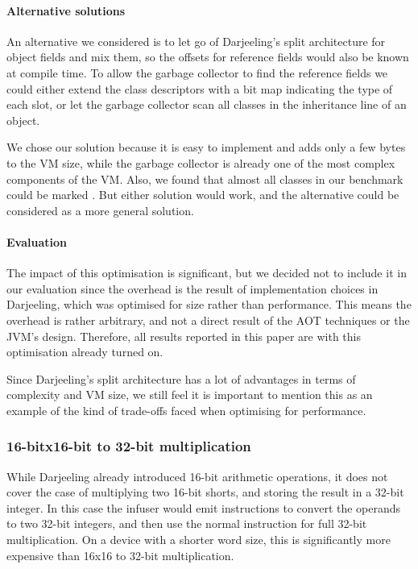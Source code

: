\paragraph{Alternative solutions} An alternative we considered is to let go of Darjeeling's split architecture for object fields and mix them, so the offsets for reference fields would also be known at compile time. To allow the garbage collector to find the reference fields we could either extend the class descriptors with a bit map indicating the type of each slot, or let the garbage collector scan all classes in the inheritance line of an object.

We chose our solution because it is easy to implement and adds only a few bytes to the VM size, while the garbage collector is already one of the most complex components of the VM. Also, we found that almost all classes in our benchmark could be marked . But either solution would work, and the alternative could be considered as a more general solution.

\paragraph{Evaluation}
The impact of this optimisation is significant, but we decided not to include it in our evaluation since the overhead is the result of implementation choices in Darjeeling, which was optimised for size rather than performance. This means the overhead is rather arbitrary, and not a direct result of the AOT techniques or the JVM's design. Therefore, all results reported in this paper are with this optimisation already turned on.

Since Darjeeling's split architecture has a lot of advantages in terms of complexity and VM size, we still feel it is important to mention this as an example of the kind of trade-offs faced when optimising for performance.

\subsubsection{ 16-bitx16-bit to 32-bit multiplication}
While Darjeeling already introduced 16-bit arithmetic operations, it does not cover the case of multiplying two 16-bit shorts, and storing the result in a 32-bit integer. In this case the infuser would emit  instructions to convert the operands to two 32-bit integers, and then use the normal  instruction for full 32-bit multiplication. On a device with a shorter word size, this is significantly more expensive than 16x16 to 32-bit multiplication.

